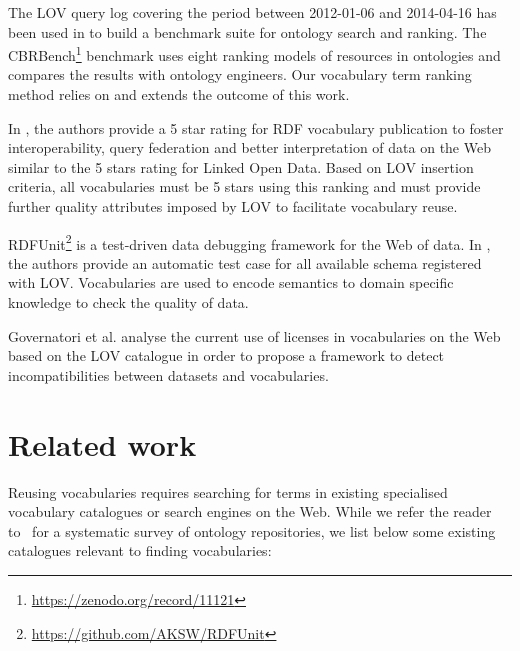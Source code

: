 \documentclass{iosart2c}
\begin{document}
The LOV query log covering the period between 2012-01-06 and 2014-04-16 has been used in \cite{butt2014} to build a benchmark suite for ontology search and ranking. The CBRBench\footnote{\url{https://zenodo.org/record/11121}} benchmark uses eight ranking models of resources in ontologies and compares the results with ontology engineers. Our vocabulary term ranking method relies on and extends the outcome of this work.

In \cite{janowicz2014five}, the authors provide a 5 star rating for RDF vocabulary publication to foster interoperability, query federation and better interpretation of data on the Web similar to the 5 stars rating for Linked Open Data. Based on LOV insertion criteria, all vocabularies must be 5 stars using this ranking and must provide further quality attributes imposed by LOV to facilitate vocabulary reuse.


RDFUnit\footnote{\url{https://github.com/AKSW/RDFUnit}} is a test-driven data debugging framework for the Web of data. In \cite{rdfunit}, the authors provide an automatic test case for all available schema registered with LOV. Vocabularies are used to encode semantics to domain specific knowledge to check the quality of data.

Governatori et al. \cite{governatori2014} analyse the current use of licenses in vocabularies on the Web based on the LOV catalogue in order to propose a framework to detect incompatibilities between datasets and vocabularies.


\section{Related work}
\label{sec:related}
Reusing vocabularies requires searching for terms in existing specialised vocabulary catalogues or search engines on the Web. While we refer the reader to~\cite{AquinJoWS12} for a systematic survey of ontology repositories, we list below some existing catalogues relevant to finding vocabularies:  
\end{document}
